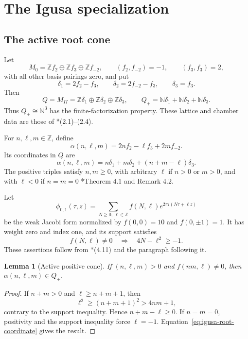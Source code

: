 \documentclass[11pt,reqno]{amsart}
\newtheorem{lemma}[theorem]{Lemma}
\theoremstyle{definition}
\theoremstyle{remark}
\begin{document}
\section{The Igusa specialization}

\subsection{The active root cone}

Let
\[
 M_0=\mathbb Zf_2\oplus\mathbb Zf_3\oplus\mathbb Zf_{-2},
 \qquad
 (f_2,f_{-2})=-1,\qquad (f_3,f_3)=2,
\]
with all other basis pairings zero, and put
\[
 \delta_1=2f_2-f_3,\qquad
 \delta_2=2f_{-2}-f_3,\qquad
 \delta_3=f_3.
\]
Then
\[
 Q=M_{II}
 =\mathbb Z\delta_1\oplus\mathbb Z\delta_2
  \oplus\mathbb Z\delta_3,\qquad
 Q_+=\mathbb N\delta_1+\mathbb N\delta_2+\mathbb N\delta_3.
\]
Thus \(Q_+\cong\mathbb N^3\) has the finite-factorization property.
These lattice and chamber data are those of
\cite{GN97}*{(2.1)--(2.4)}.

For \(n,\ell,m\in\mathbb Z\), define
\[
 \alpha(n,\ell,m)=2nf_2-\ell f_3+2mf_{-2}.
\]
Its coordinates in \(Q\) are
\begin{equation}
 \alpha(n,\ell,m)
 =n\delta_1+m\delta_2+(n+m-\ell)\delta_3.
 \label{eq:igusa-root-coordinate}
\end{equation}
The positive triples satisfy \(n,m\ge0\), with arbitrary \(\ell\) if
\(n>0\) or \(m>0\), and with \(\ell<0\) if \(n=m=0\)
\cite{GN97}*{Theorem 4.1 and Remark 4.2}.

Let
\[
 \phi_{0,1}(\tau,z)
 =\sum_{N\ge0,\ \ell\in\mathbb Z}
 f(N,\ell)e^{2\pi i(N\tau+\ell z)}
\]
be the weak Jacobi form normalized by
\(f(0,0)=10\) and \(f(0,\pm1)=1\).  It has weight zero and index one,
and its support satisfies
\[
 f(N,\ell)\ne0\quad\Longrightarrow\quad
 4N-\ell^2\ge-1.
\]
These assertions follow from
\cite{GN97}*{(4.11) and the paragraph following it}.

\begin{lemma}[Active positive cone]
\label{lem:igusa-active-cone}
If \((n,\ell,m)>0\) and \(f(nm,\ell)\ne0\), then
\(\alpha(n,\ell,m)\in Q_+\).
\end{lemma}

\begin{proof}
If \(n+m>0\) and \(\ell\ge n+m+1\), then
\[
 \ell^2\ge(n+m+1)^2>4nm+1,
\]
contrary to the support inequality.  Hence \(n+m-\ell\ge0\).
If \(n=m=0\), positivity and the support inequality force
\(\ell=-1\).  Equation~\eqref{eq:igusa-root-coordinate} gives the
result.
\end{proof}
\end{document}
